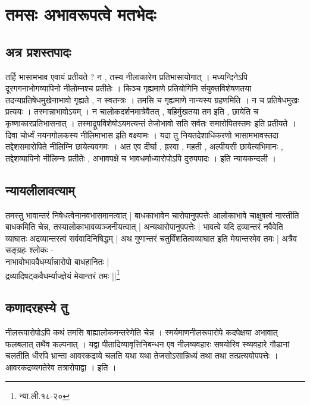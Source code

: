 \chapter{तमसः अभावरूपत्वे मतभेदः}

\section{अत्र प्रशस्तपादः} तर्हि भासामभाव एवायं प्रतीयते ? न , तस्य नीलाकारेण प्रतिभासायोगात् । मध्यन्दिनेऽपि दूरगगनाभोगव्यापिनो नीलोम्नश्च प्रतीतेः । किञ्च गृह्यमाणे प्रतियोगिनि संयुक्तविशेषणतया तदन्यप्रतिषेधमुखेनाभावो गृह्यते , न स्वतन्त्रः । तमसि च गृह्यमाणे नान्यस्य ग्रहणमिति । न च प्रतिषेधमुखः प्रत्ययः । तस्मान्नाभावोऽयम् । न चालोकदर्शनमात्रेवैतत् , बहिर्मुखतया तम इति , छायेति च कृष्णाकारप्रतिभासनात् । तस्माद्रूपविशेषोऽयमत्यन्तं तेजोभावो सति सर्वतः समारोपितस्तमः इति प्रतीयते । दिवा चोर्ध्वं नयनगोलकस्य नीलिमाभास इति वक्ष्यामः । यदा तु नियतदेशाधिकरणो भासामभावस्तदा तद्देशसमारोपिते नीलिम्नि छायेत्यवगमः । अत एव दीर्घा , ह्रस्वा , महती , अल्पीयसी छायेत्यभिमानः , तद्देशव्यापिनो नीलिम्नः प्रतीतेः , अभावपक्षे च भावधर्माध्यारोपोऽपि दुरुपपादः ।  इति न्यायकन्दली ।

\section{न्यायलीलावत्याम्} तमस्तु भावान्तरं निषेधत्वेनानवभासमानत्वात् | बाधकाभावेन चारोपानुपपत्तेः आलोकाभावे चाक्षुषत्वं नास्तीति बाधकमिति चेन्न, तस्यालोकाभावव्यञ्जनीयत्वात् | अन्यथारोपानुपपत्तेः | भावत्वे यदि द्रव्यान्तरं नवैवेति व्याघातः अद्रव्यान्तरत्वं सर्ववादिनिषिद्धम् | अथ गुणान्तरं चतुर्विंशतित्वव्याघात इति मेयान्तरमेव तमः | अत्रैव सङ्ग्रहः श्लोकः -\\ नाभावोभाववैधर्म्यान्नारोपो बाधहानितः |\\[-5mm] द्रव्यादिषट्कवैधर्म्याज्ज्ञेयं मेयान्तरं तमः ||\footnote{न्या.ली.१८-२०}

	
\section{कणादरहस्ये तु} नीलरूपारोपोऽपि कथं तमसि बाह्यालोकमन्तरेणेति चेन्न । स्मर्यमाणनीलरूपारोपे कदपेक्षया अभावात् फलबलात् तथैव कल्पनात् । यद्वा पीतादिव्यावृत्तिनिबन्धन एव नीलव्यवहारः सषयोरिव स्व्यवहारे गौडानां चलतीति धीरपि भ्रान्ता आवरकद्रव्ये चलति यथा यथा तेजसोऽसान्निध्यं तथा तथा तत्प्रत्ययोपपत्तेः । आवरकद्रव्यगतेरेव तत्रारोपाद्वा । इति ।

